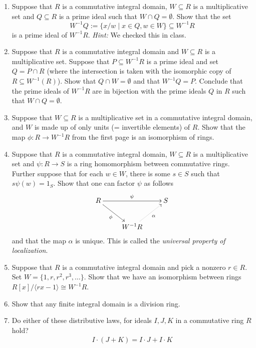 \documentclass[11pt]{amsart}
\renewcommand{\to}[1][]{\xrightarrow{\ #1\ }}
\begin{document}
\begin{enumerate}
    \item Suppose that $R$ is a commutative integral domain, $W \subseteq R$ is a multiplicative set and $Q \subseteq R$ is a prime ideal such that $W \cap Q = \emptyset$.  Show that the set
    \[
    W^{-1} Q := \{ x/w \;|\; x \in Q, w \in W \} \subseteq W^{-1} R
    \]
    is a prime ideal of $W^{-1} R$.
    \vskip 3pt
    \emph{Hint:}  We checked this in class.
    \newpage
    \item  Suppose that $R$ is a
    commutative integral domain and $W \subseteq R$ is a multiplicative set.  Suppose that $P \subseteq W^{-1} R$ is a prime ideal and set $Q = P \cap R$ (where the intersection is taken with the isomorphic copy of $R \subseteq W^{-1}(R)$).  Show that $Q \cap W = \emptyset$ and that $W^{-1} Q = P$.
    \vskip 9pt
    Conclude that the prime ideals of $W^{-1} R$ are in bijection with the prime ideals $Q$ in $R$ such that $W \cap Q = \emptyset$.
    \newpage
    \item  Suppose that $W \subseteq R$ is a multiplicative set in a commutative integral domain, and $W$ is made up of only units (= invertible elements) of $R$.  Show that the map $\phi : R \to W^{-1} R$ from the first page is an isomorphism of rings.
    \newpage
    \item  Suppose that $R$ is a commutative integral domain, $W \subseteq R$ is a multiplicative set and $\psi : R \to S$ is a ring homomorphism between commutative rings.  Further suppose that for each $w \in W$, there is some $s \in S$ such that $s \psi(w) = 1_S$.  Show that one can factor $\psi$ as follows
    \[
    \xymatrix{
    R \ar[dr]_-{\phi} \ar[rr]^{\psi} & & S\\
    & W^{-1} R \ar@{.>}[ur]_-{\alpha}
    }
    \]
    and that the map $\alpha$ is unique.  This is called the \emph{universal property of localization}.
    \newpage
    \item Suppose that $R$ is a commutative integral domain and pick a nonzero $r \in R$.  Set $W = \{1, r, r^2, r^3, \dots\}$.  Show that we have an isomorphism between rings $R[x]/\langle rx - 1 \rangle \cong W^{-1}R$.  
    \newpage
    \item Show that any finite integral domain is a division ring.
    \newpage
    \item Do either of these distributive laws, for ideals $I, J, K$ in a commutative ring $R$ hold?
    \[
        \begin{array}{c}
            I\cdot (J + K) = I \cdot J + I \cdot K\\

\end{array}\]
\end{enumerate}
\end{document}
